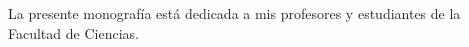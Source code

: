 \begin{dedication}
La presente monografía está dedicada a mis profesores y estudiantes de la Facultad de Ciencias.
\end{dedication}